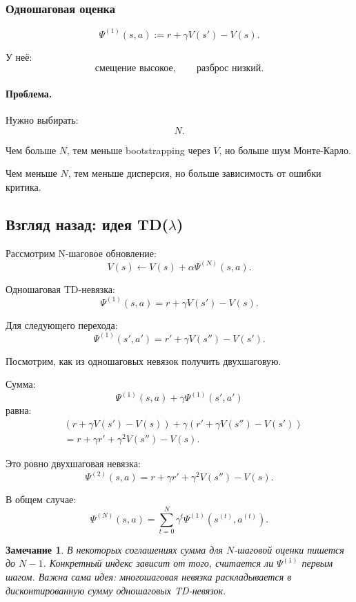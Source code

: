 \documentclass[12pt,a4paper]{article}
\newtheorem{remark}{Замечание}
\begin{document}
\subsubsection{Одношаговая оценка}

\[
\Psi^{(1)}(s,a)
:=
r+\gamma V(s')-V(s).
\]

У неё:
\[
\text{смещение высокое},
\qquad
\text{разброс низкий}.
\]

\paragraph{Проблема.}

Нужно выбирать:
\[
N.
\]

Чем больше $N$, тем меньше bootstrapping через $V$, но больше шум Монте-Карло.

Чем меньше $N$, тем меньше дисперсия, но больше зависимость от ошибки критика.

\subsection{Взгляд назад: идея TD($\lambda$)}

Рассмотрим N-шаговое обновление:
\[
V(s)
\leftarrow
V(s)
+
\alpha
\Psi^{(N)}(s,a).
\]

Одношаговая TD-невязка:
\[
\Psi^{(1)}(s,a)
=
r+\gamma V(s')-V(s).
\]

Для следующего перехода:
\[
\Psi^{(1)}(s',a')
=
r'
+
\gamma V(s'')
-
V(s').
\]

Посмотрим, как из одношаговых невязок получить двухшаговую.

Сумма:
\[
\Psi^{(1)}(s,a)
+
\gamma
\Psi^{(1)}(s',a')
\]
равна:
\[
\begin{aligned}
&
\left(
r+\gamma V(s')-V(s)
\right)
+
\gamma
\left(
r'
+
\gamma V(s'')
-
V(s')
\right)
\\
&=
r+\gamma r'
+\gamma^2 V(s'')
-
V(s).
\end{aligned}
\]

Это ровно двухшаговая невязка:
\[
\Psi^{(2)}(s,a)
=
r+\gamma r'
+
\gamma^2 V(s'')
-
V(s).
\]

В общем случае:
\[
\Psi^{(N)}(s,a)
=
\sum_{t=0}^{N}
\gamma^t
\Psi^{(1)}(s^{(t)},a^{(t)}).
\]

\begin{remark}
В некоторых соглашениях сумма для $N$-шаговой оценки пишется до $N-1$. Конкретный индекс зависит от того, считается ли $\Psi^{(1)}$ первым шагом. Важна сама идея: многошаговая невязка раскладывается в дисконтированную сумму одношаговых TD-невязок.
\end{remark}
\end{document}
